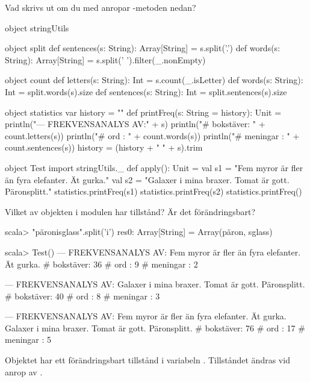 \Subtask Vad skrivs ut om du med  anropar -metoden nedan?
\begin{CodeSmall}
object stringUtils {
  object split {
    def sentences(s: String): Array[String] = s.split('.')
    def words(s: String): Array[String] = s.split(' ').filter(_.nonEmpty)
  }

  object count {
    def letters(s: String):   Int = s.count(_.isLetter)
    def words(s: String):     Int = split.words(s).size
    def sentences(s: String): Int = split.sentences(s).size
  }

  object statistics {
    var history = ""
    def printFreq(s: String = history): Unit = {
      println("\n--- FREKVENSANALYS AV:\n" + s)
      println("# bokstäver: " + count.letters(s))
      println("# ord      : " + count.words(s))
      println("# meningar : " + count.sentences(s))
      history = (history + " " + s).trim
    }
  }
}

object Test {
  import stringUtils._
  def apply(): Unit = {
    val s1 = "Fem     myror är fler än fyra elefanter. Ät gurka."
    val s2 = "Galaxer i mina braxer. Tomat är gott. Päronsplitt."
    statistics.printFreq(s1)
    statistics.printFreq(s2)
    statistics.printFreq()
  }
}
\end{CodeSmall}

\Subtask Vilket av objekten i modulen  har tillstånd? Är det förändringsbart?


\SOLUTION


\TaskSolved \what

\SubtaskSolved
\begin{REPLnonum}
scala> "päronisglass".split('i')
res0: Array[String] = Array(päron, sglass)
\end{REPLnonum}

\SubtaskSolved
\begin{REPLnonum}
scala> Test()
--- FREKVENSANALYS AV:
Fem     myror är fler än fyra elefanter. Ät gurka.
# bokstäver: 36
# ord      : 9
# meningar : 2

--- FREKVENSANALYS AV:
Galaxer i mina braxer. Tomat är gott. Päronsplitt.
# bokstäver: 40
# ord      : 8
# meningar : 3

--- FREKVENSANALYS AV:
Fem     myror är fler än fyra elefanter. Ät gurka. Galaxer i mina braxer. Tomat
är gott. Päronsplitt.
# bokstäver: 76
# ord      : 17
# meningar : 5
\end{REPLnonum}

\SubtaskSolved  Objektet  har ett förändringsbart tillstånd i variabeln . Tillståndet ändras vid anrop av .

